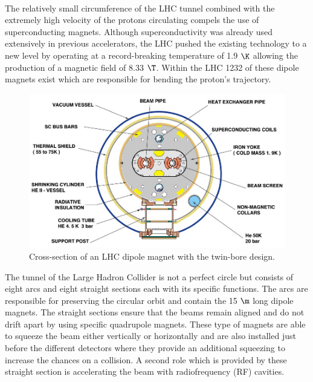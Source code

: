 \\
The relatively small circumference of the LHC tunnel combined with the extremely high velocity of the protons circulating compels the use of superconducting magnets. Although superconductivity was already used extensively in previous accelerators, the LHC pushed the existing technology to a new level by operating at a record-breaking temperature of 1.9 $\K$ allowing the production of a magnetic field of 8.33 $\T$. Within the LHC 1232 of these dipole magnets exist which are responsible for bending the proton's trajectory.
\begin{figure}[h!t]
 \centering
 \includegraphics[width = 0.6 \textwidth]{Chapters/Chapter2_CERN/Figures/lhc-pho-1998-341.jpg}
 \caption{Cross-section of an LHC dipole magnet with the twin-bore design.}%
 \label{fig::LHCDipole}
\end{figure}

The tunnel of the Large Hadron Collider is not a perfect circle but consists of eight arcs and eight straight sections each with its specific functions. 
The arcs are responsible for preserving the circular orbit and contain the 15 $\m$ long dipole magnets.
The straight sections ensure that the beams remain aligned and do not drift apart by using specific quadrupole magnets. These type of magnets are able to squeeze the beam either vertically or horizontally and are also installed just before the different detectors where they provide an additional squeezing to increase the chances on a collision. A second role which is provided by these straight section is accelerating the beam with radiofrequency (RF) cavities.

